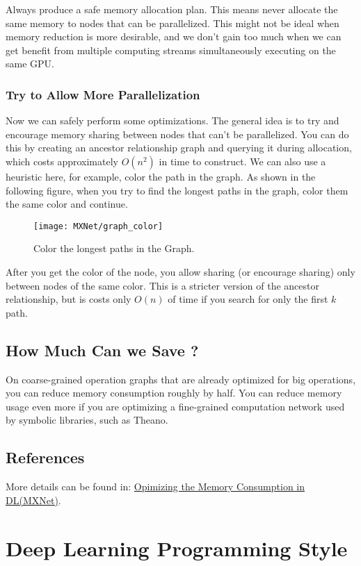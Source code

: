 Always produce a safe memory allocation plan. This means never allocate the same memory to nodes that can be parallelized. This might not be ideal when memory reduction is more desirable, and we don’t gain too much when we can get benefit from multiple computing streams simultaneously executing on the same GPU.

\subsubsection{Try to Allow More Parallelization}
Now we can safely perform some optimizations. The general idea is to try and encourage memory sharing between nodes that can’t be parallelized. You can do this by creating an ancestor relationship graph and querying it during allocation, which costs approximately $O(n^2)$ in time to construct. We can also use a heuristic here, 
for example, color the path in the graph. As shown in the following figure, when you try to find the longest paths in the graph, color them the same color and continue.
\begin{figure}[!hbtp]
\centering
\texttt{[image: MXNet/graph\_color]}
\caption{Color the longest paths in the Graph.}
\end{figure}

After you get the color of the node, you allow sharing (or encourage sharing) only between nodes of the same color. This is a stricter version of the ancestor relationship, but is costs only $O(n)$ of time if you search for only the first $k$ path.

\subsection{How Much Can we Save ?}
On coarse-grained operation graphs that are already optimized for big operations, you can reduce memory consumption roughly by half. You can reduce memory usage even more if you are optimizing a fine-grained computation network used by symbolic libraries, such as Theano.

\subsection{References}
More details can be found in: \href{https://mxnet.incubator.apache.org/architecture/note_memory.html#how-much-can-you-save}{Opimizing the Memory Consumption in DL(MXNet)}.


\section{Deep Learning Programming Style}

